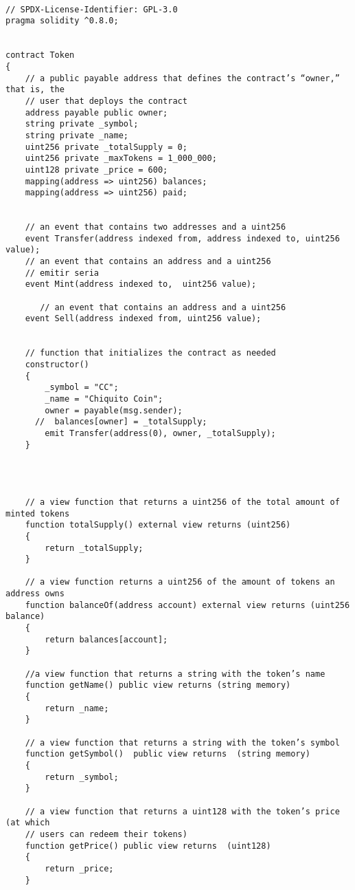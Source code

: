 \documentclass[12pt,addpoints,answers]{exam}
\begin{document}
\begin{questions}
\begin{parts}
    \begin{solution} %

\begin{verbatim}

// SPDX-License-Identifier: GPL-3.0
pragma solidity ^0.8.0;


contract Token
{
    // a public payable address that defines the contract’s “owner,” that is, the
    // user that deploys the contract
    address payable public owner;
    string private _symbol;
    string private _name;
    uint256 private _totalSupply = 0;
    uint256 private _maxTokens = 1_000_000;
    uint128 private _price = 600;
    mapping(address => uint256) balances;
    mapping(address => uint256) paid;


    // an event that contains two addresses and a uint256
    event Transfer(address indexed from, address indexed to, uint256 value);
    // an event that contains an address and a uint256
    // emitir seria
    event Mint(address indexed to,  uint256 value);

       // an event that contains an address and a uint256
    event Sell(address indexed from, uint256 value);


    // function that initializes the contract as needed
    constructor()
    {
        _symbol = "CC";
        _name = "Chiquito Coin";
        owner = payable(msg.sender);
      //  balances[owner] = _totalSupply;
        emit Transfer(address(0), owner, _totalSupply);
    }




    // a view function that returns a uint256 of the total amount of minted tokens
    function totalSupply() external view returns (uint256)
    {
        return _totalSupply;
    }

    // a view function returns a uint256 of the amount of tokens an address owns
    function balanceOf(address account) external view returns (uint256 balance)
    {
        return balances[account];
    }

    //a view function that returns a string with the token’s name
    function getName() public view returns (string memory)
    {
        return _name;
    }

    // a view function that returns a string with the token’s symbol
    function getSymbol()  public view returns  (string memory)
    {
        return _symbol;
    }

    // a view function that returns a uint128 with the token’s price (at which
    // users can redeem their tokens)
    function getPrice() public view returns  (uint128)
    {
        return _price;
    }


\end{verbatim}
\end{solution}
\end{parts}
\end{questions}
\end{document}
